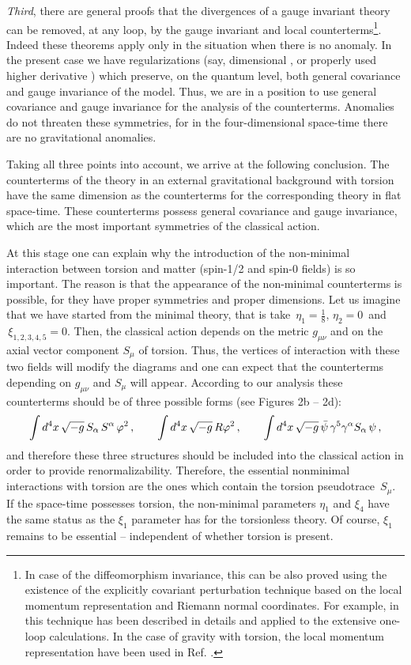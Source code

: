 {\large\it Third}, there
are general proofs \cite{volatyu} that the divergences of a 
gauge invariant theory can be removed, at any loop, by the 
gauge invariant and local counterterms\footnote{In 
case of the diffeomorphism invariance, this
can be also proved using the existence of the explicitly 
covariant perturbation technique based on the local momentum 
representation and Riemann normal coordinates. 
For example, in \cite{parker-toms} this technique has been 
described in details and applied to the extensive one-loop 
calculations. In the case of gravity with torsion, the local 
momentum representation have been used in Ref. \cite{cogzer}.}.
Indeed these 
theorems apply only in the situation when there is no anomaly. 
In the present case we have regularizations (say, dimensional 
\cite{hooft,leibr}, or properly used higher derivative 
\cite{slavnov, asorey}) which preserve, on the quantum level,
both general covariance and gauge invariance of the model. 
Thus, we are in a position to use general covariance and 
gauge invariance for the analysis of the counterterms.
Anomalies do not threaten these symmetries, for in the 
four-dimensional space-time there are no gravitational 
anomalies. 

Taking all three points into account, we arrive at the following 
conclusion. The counterterms of the theory in an external 
gravitational background with torsion have the same dimension 
as the counterterms for the corresponding theory in flat 
space-time. These counterterms possess general covariance and
gauge invariance, which are the most important symmetries of
the classical action. 

At this stage one can
explain why the introduction of the non-minimal interaction 
between torsion and matter (spin-1/2 and spin-0 fields) is so 
important. The reason is that the appearance of the
non-minimal 
counterterms is possible, for they have proper symmetries 
and proper dimensions. Let us imagine that we have started 
from the
minimal theory, that is take $\,\eta_1=\frac18,\,\eta_2=0\,$
and $\,\xi_{1,2,3,4,5}=0.$ Then, the classical action depends on 
the metric
$g_{\mu\nu}$ and on the axial vector component $S_\mu$ of torsion.
Thus, the vertices of interaction with these two fields will 
modify the diagrams and one can expect that the counterterms
depending on $g_{\mu\nu}$ and $S_\mu$ will appear. According 
to our analysis these counterterms should be of three possible
forms (see Figures 2b -- 2d): 
$$
\int d^4x\,\sqrt{-g}\,S_\alpha\,S^\alpha\,\varphi^2
\,,\,\,\,\,\,\,\,\,\,\,\,\,
\int d^4x\,\sqrt{-g}\,R\varphi^2
\,,\,\,\,\,\,\,\,\,\,\,\,\,
\int d^4x\,\sqrt{-g}\,{\bar \psi}\,\gamma^5\gamma^\alpha S_\alpha\,\psi\,,
$$
and therefore these three structures should be included into 
the classical action in order to provide renormalizability. 
Therefore, the essential nonminimal interactions with 
torsion are the
ones which contain the torsion pseudotrace $\,S_{\mu}$.
If the space-time possesses torsion, the non-minimal parameters 
$\eta_1$ and $\xi_4$ have the same status as the $\xi_1$
parameter 
has for the torsionless theory. Of course, $\xi_1$ remains
to be essential -- independent of whether torsion is present. 

